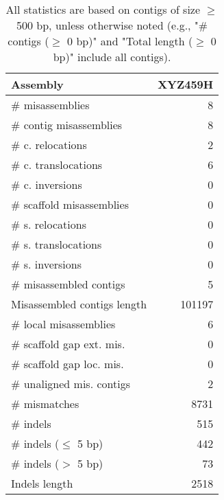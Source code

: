 \documentclass[12pt,a4paper]{article}
\begin{document}
\begin{table}[ht]
\begin{center}
\caption{All statistics are based on contigs of size $\geq$ 500 bp, unless otherwise noted (e.g., "\# contigs ($\geq$ 0 bp)" and "Total length ($\geq$ 0 bp)" include all contigs).}
\begin{tabular}{|l*{1}{|r}|}
\hline
Assembly & XYZ459H \\ \hline
\# misassemblies & 8 \\ \hline
\hspace{2mm}\# contig misassemblies & 8 \\ \hline
\hspace{5mm}\# c. relocations & 2 \\ \hline
\hspace{5mm}\# c. translocations & 6 \\ \hline
\hspace{5mm}\# c. inversions & 0 \\ \hline
\hspace{2mm}\# scaffold misassemblies & 0 \\ \hline
\hspace{5mm}\# s. relocations & 0 \\ \hline
\hspace{5mm}\# s. translocations & 0 \\ \hline
\hspace{5mm}\# s. inversions & 0 \\ \hline
\# misassembled contigs & 5 \\ \hline
Misassembled contigs length & 101197 \\ \hline
\# local misassemblies & 6 \\ \hline
\# scaffold gap ext. mis. & 0 \\ \hline
\# scaffold gap loc. mis. & 0 \\ \hline
\# unaligned mis. contigs & 2 \\ \hline
\# mismatches & 8731 \\ \hline
\# indels & 515 \\ \hline
\hspace{5mm}\# indels ($\leq$ 5 bp) & 442 \\ \hline
\hspace{5mm}\# indels ($>$ 5 bp) & 73 \\ \hline
Indels length & 2518 \\ \hline
\end{tabular}
\end{center}
\end{table}
\end{document}
